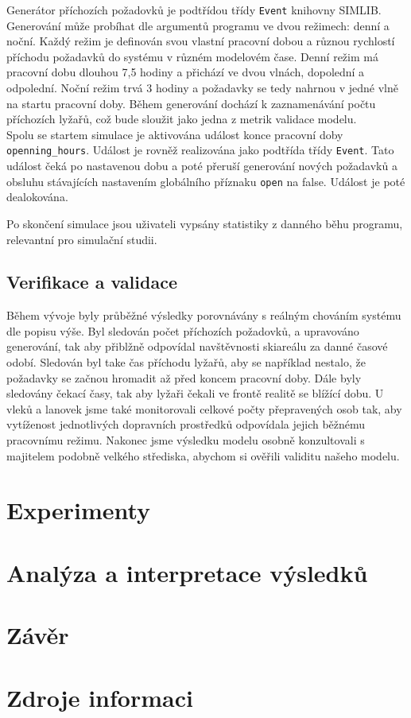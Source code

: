 \documentclass[a4paper, 11pt]{article}\usepackage{times}
\begin{document}
 Generátor příchozích požadovků je podtřídou třídy \texttt{Event} knihovny SIMLIB.
 Generování může probíhat dle argumentů programu ve dvou režimech: denní a noční. Každý režim je definován svou vlastní pracovní dobou a různou rychlostí příchodu požadavků do systému v různém modelovém čase. Denní režim má pracovní dobu dlouhou 7,5 hodiny a přichází ve dvou vlnách, dopolední a odpolední. Noční režim trvá 3 hodiny a požadavky se tedy nahrnou v jedné vlně na startu pracovní doby. Během generování dochází k zaznamenávání počtu příchozích lyžařů, což bude sloužit jako jedna z metrik validace modelu. \\
 Spolu se startem simulace je aktivována událost konce pracovní doby \texttt{openning\_hours}. Událost je rovněž realizována jako podtřída třídy  \texttt{Event}. Tato událost čeká po nastavenou dobu a poté přeruší generování nových požadavků a obsluhu stávajících nastavením globálního příznaku \texttt{open} na false. Událost je poté dealokována.

 Po skončení simulace jsou uživateli vypsány statistiky z danného běhu programu, relevantní pro simulační studii.

\subsection{Verifikace a validace}

Během vývoje byly průběžné výsledky porovnávány s reálným chováním systému dle popisu výše.
Byl sledován počet příchozích požadovků, a upravováno generování, tak aby přiblžně odpovídal navštěvnosti skiareálu za danné časové odobí. Sledován byl take čas příchodu lyžařů, aby se například nestalo, že požadavky se začnou hromadit až před koncem pracovní doby. Dále byly sledovány čekací časy, tak aby lyžaři čekali ve frontě realitě se blížící dobu. U vleků a lanovek jsme také monitorovali celkové počty přepravených osob tak, aby vytíženost jednotlivých dopravních prostředků odpovídala jejich běžnému pracovnímu režimu. Nakonec jsme výsledku modelu osobně konzultovali s majitelem podobně velkého střediska, abychom si ověřili validitu našeho modelu.

\section{Experimenty}

\section{Analýza a interpretace výsledků} %

\section{Závěr} %

\section{Zdroje informaci}

	
\end{document}
